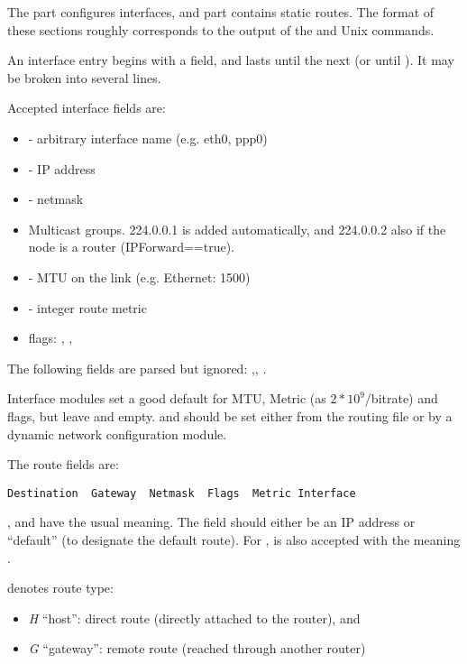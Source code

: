 The  part configures interfaces,
and  part contains static routes.
The format of these sections roughly corresponds to the output
of the  and  Unix commands.

An interface entry begins with a  field, and lasts until
the next  (or until ). It may
be broken into several lines.

Accepted interface fields are:

\begin{itemize}
  \item {} - arbitrary interface name (e.g. eth0, ppp0)
  \item {} - IP address
  \item {} - netmask
  \item {} Multicast groups. 224.0.0.1 is added automatically,
     and 224.0.0.2 also if the node is a router (IPForward==true).
  \item {} - MTU on the link (e.g. Ethernet: 1500)
  \item {} - integer route metric
  \item flags: , , 
\end{itemize}

The following fields are parsed but ignored: ,,
.

Interface modules set a good default for MTU, Metric (as $2*10^9$/bitrate) and
flags, but leave  and  empty.  and
 should be set either from the routing file or by a dynamic network
configuration module.

The route fields are:

\begin{verbatim}
Destination  Gateway  Netmask  Flags  Metric Interface
\end{verbatim}

,  and  have the usual meaning.
The  field should either be an IP address or ``default''
(to designate the default route). For , \ttt{*} is also
accepted with the meaning .

 denotes route type:

\begin{itemize}
  \item \textit{H} ``host'': direct route (directly attached to the router), and
  \item \textit{G} ``gateway'': remote route (reached through another router)
\end{itemize}

